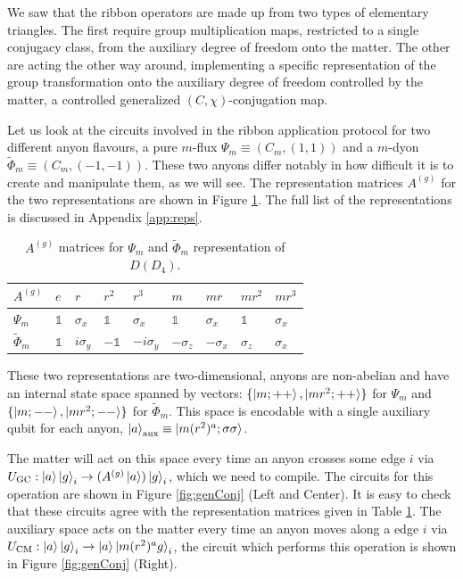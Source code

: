 \documentclass[two column]{article}
\begin{document}
We saw that the ribbon operators are made up from two types of elementary triangles. The first require group multiplication maps, restricted to a single conjugacy class, from the auxiliary degree of freedom onto the matter. The other are acting the other way around, implementing a specific representation of the group transformation onto the auxiliary degree of freedom controlled by the matter, a controlled generalized $(C, \chi)$-conjugation map.

Let us look at the circuits involved in the ribbon application protocol for two different anyon flavours, a pure $m$-flux $\Psi_m \equiv (C_m, (1,1))$ and a $m$-dyon $\tilde{\Phi}_m \equiv (C_m, (-1, -1))$. These two anyons differ notably in how difficult it is to create and manipulate them, as we will see. The representation matrices $A^{(g)}$ for the two representations are shown in Figure \ref{tab:somereps}. The full list of the representations is discussed in Appendix \ref{app:reps}.

\begin{table}[]
    \centering
    \begin{tabular}{|p{0.5cm}||p{0.25cm}|p{0.5cm}|p{0.5cm}|p{0.6cm}|p{0.5cm}|p{0.5cm}|p{0.5cm}|p{0.5cm}|}
    \hline
  $A^{(g)}$ & $e$ &   $r$ & $r^2$ & $r^3$ &  $m$ & $mr$ & $mr^2$ & $mr^3$ \\
\hline\hline
 $\Psi_{m}$ &$\mathbb{1}$&  $\sigma_x$ & $\mathbb{1}$&  $\sigma_x$ & $\mathbb{1}$& $\sigma_x$ &  $\mathbb{1}$&   $\sigma_x$ \\\hline
 $\tilde{\Phi}_{m}$ &$\mathbb{1}$&$i\sigma_y$ &$-\mathbb{1}$& $-i\sigma_y$ &$-\sigma_z$ &$-\sigma_x$ &  $\sigma_z$ &   $\sigma_x$ \\\hline
\end{tabular}
    \caption{$A^{(g)}$ matrices for $\Psi_m$ and $\tilde{\Phi}_m$ representation of $D(D_4)$.}
    \label{tab:somereps}
\end{table}

These two representations are two-dimensional, anyons are non-abelian and have an internal state space spanned by vectors: $\{\ket{m; ++}, \ket{mr^2; ++}\}$ for $\Psi_m$ and $\{\ket{m; --}, \ket{mr^2; --}\}$ for $\tilde{\Phi}_m$.
This space is encodable with a single auxiliary qubit for each anyon, $\ket{a}_{\text{aux}} \equiv \ket{m(r^2)^a; \sigma\sigma}$.

The matter will act on this space every time an anyon crosses some edge $i$ via $U_{\text{GC}}: \ket{a}\ket{g}_i \rightarrow (A^{(g)}\ket{a})\ket{g}_i$, which we need to compile.
The circuits for this operation are shown in Figure \ref{fig:genConj} (Left and Center).
It is easy to check that these circuits agree with the representation matrices given in Table \ref{tab:somereps}. 
The auxiliary space acts on the matter every time an anyon moves along a edge $i$ via $U_{\text{CM}}: \ket{a}\ket{g}_i \rightarrow \ket{a}\ket{m(r^2)^a g}_i$, the circuit which performs this operation is shown in Figure \ref{fig:genConj} (Right).
\end{document}
